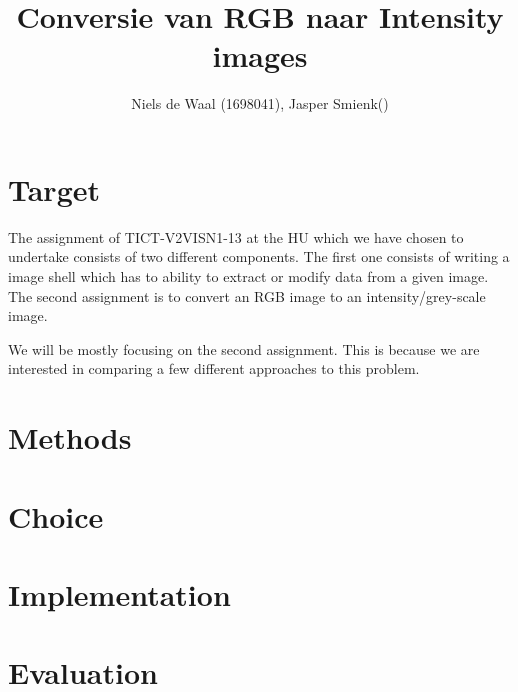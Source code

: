 \documentclass{report}
\begin{document}
\title{Conversie van RGB naar Intensity images}
\author{Niels de Waal (1698041), Jasper Smienk()}
\maketitle
\newpage

\tableofcontents
\newpage

\section{Target}
The assignment of TICT-V2VISN1-13 at the HU which we have chosen to undertake consists of two different components.
The first one consists of writing a image shell which has to ability to extract or modify data from a given image.
The second assignment is to convert an RGB image to an intensity/grey-scale image. 

We will be mostly focusing on the second assignment. This is because we are interested in comparing a few different approaches to this problem.

\section{Methods}

\section{Choice}

\section{Implementation}

\section{Evaluation}
\end{document}
